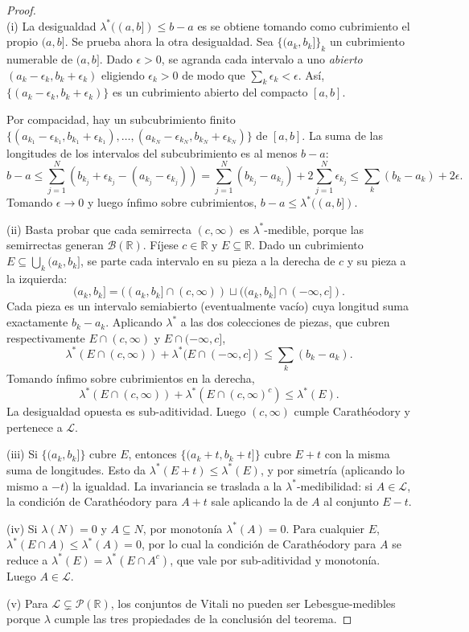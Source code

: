 \documentclass[11pt, a4paper]{article}
\begin{document}
\begin{proof}\leavevmode\\
(i) La desigualdad $\lambda^*((a, b]) \le b - a$ es
se obtiene tomando como cubrimiento el propio $(a, b]$. Se prueba ahora la otra desigualdad. Sea
$\{(a_k, b_k]\}_k$ un cubrimiento numerable de $(a, b]$. Dado $\epsilon > 0$, se agranda cada
intervalo a uno \emph{abierto} $(a_k - \epsilon_k, b_k + \epsilon_k)$ eligiendo $\epsilon_k > 0$
de modo que $\sum_k \epsilon_k < \epsilon$. Así, $\{(a_k - \epsilon_k, b_k + \epsilon_k)\}$ es un
cubrimiento abierto del compacto $[a, b]$.

Por compacidad, hay un subcubrimiento finito $\{(a_{k_1} - \epsilon_{k_1}, b_{k_1} +
\epsilon_{k_1}), \dots, (a_{k_N} - \epsilon_{k_N}, b_{k_N} + \epsilon_{k_N})\}$ de $[a, b]$. La suma de las longitudes
de los intervalos del subcubrimiento es al menos $b - a$:
$$ b - a \le \sum_{j=1}^N (b_{k_j} + \epsilon_{k_j} - (a_{k_j} - \epsilon_{k_j})) = \sum_{j=1}^N
(b_{k_j} - a_{k_j}) + 2 \sum_{j=1}^N \epsilon_{k_j} \le \sum_k (b_k - a_k) + 2\epsilon. $$
Tomando $\epsilon \to 0$ y luego ínfimo sobre cubrimientos, $b - a \le \lambda^*((a, b])$.

(ii) Basta probar que cada semirrecta
$(c, \infty)$ es $\lambda^*$-medible, porque las semirrectas generan $\mathcal{B}(\mathbb{R})$.
Fíjese $c \in \mathbb{R}$ y $E \subseteq \mathbb{R}$. Dado un cubrimiento $E \subseteq \bigcup_k
(a_k, b_k]$, se parte cada intervalo en su pieza a la derecha de $c$ y su pieza a la izquierda:
$$ (a_k, b_k] = ((a_k, b_k] \cap (c, \infty)) \sqcup ((a_k, b_k] \cap (-\infty, c]). $$
Cada pieza es un intervalo semiabierto (eventualmente vacío) cuya longitud suma exactamente
$b_k - a_k$. Aplicando $\lambda^*$ a las dos colecciones de piezas, que cubren respectivamente
$E \cap (c, \infty)$ y $E \cap (-\infty, c]$,
$$ \lambda^*(E \cap (c, \infty)) + \lambda^*(E \cap (-\infty, c]) \le \sum_k (b_k - a_k). $$
Tomando ínfimo sobre cubrimientos en la derecha,
$$ \lambda^*(E \cap (c, \infty)) + \lambda^*(E \cap (c, \infty)^c) \le \lambda^*(E). $$
La desigualdad opuesta es sub-aditividad. Luego $(c, \infty)$ cumple Carathéodory y pertenece a
$\mathcal{L}$.

(iii) Si $\{(a_k, b_k]\}$ cubre $E$, entonces
$\{(a_k + t, b_k + t]\}$ cubre $E + t$ con la misma suma de longitudes. Esto da $\lambda^*(E + t)
\le \lambda^*(E)$, y por simetría (aplicando lo mismo a $-t$) la igualdad. La invariancia se
traslada a la $\lambda^*$-medibilidad: si $A \in \mathcal{L}$, la condición de Carathéodory
para $A + t$ sale aplicando la de $A$ al conjunto $E - t$.

(iv) Si $\lambda(N) = 0$ y $A \subseteq N$, por monotonía $\lambda^*(A)
= 0$. Para cualquier $E$, $\lambda^*(E \cap A) \le \lambda^*(A) = 0$, por lo cual la condición de
Carathéodory para $A$ se reduce a $\lambda^*(E) = \lambda^*(E \cap A^c)$, que vale por
sub-aditividad y monotonía. Luego $A \in \mathcal{L}$.

(v) Para $\mathcal{L} \subsetneq \mathcal{P}(\mathbb{R})$, los conjuntos
de Vitali no pueden ser Lebesgue-medibles porque $\lambda$ cumple las
tres propiedades de la conclusión del teorema.
\end{proof}
\end{document}

